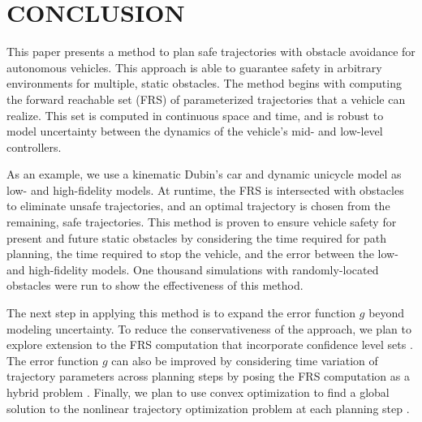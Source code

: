 \section{CONCLUSION}
\label{sec:conclusion}


This paper presents a method to plan safe trajectories with obstacle avoidance for autonomous vehicles.
This approach is able to guarantee safety in arbitrary environments for multiple, static obstacles.
The method begins with computing the forward reachable set (FRS) of parameterized trajectories that a vehicle can realize.
This set is computed in continuous space and time, and is robust to model uncertainty between the dynamics of the vehicle's mid- and low-level controllers.

As an example, we use a kinematic Dubin's car and dynamic unicycle model as low- and high-fidelity models.
At runtime, the FRS is intersected with obstacles to eliminate unsafe trajectories, and an optimal trajectory is chosen from the remaining, safe trajectories.
This method is proven to ensure vehicle safety for present and future static obstacles by considering the time required for path planning, the time required to stop the vehicle, and the error between the low- and high-fidelity models.
One thousand simulations with randomly-located obstacles were run to show the effectiveness of this method. 


The next step in applying this method is to expand the error function $g$ beyond modeling uncertainty.
To reduce the conservativeness of the approach, we plan to explore extension to the FRS computation that incorporate confidence level sets \cite{mohan2016convex,holmes2016convex}.
The error function $g$ can also be improved by considering time variation of trajectory parameters across planning steps by posing the FRS computation as a hybrid problem \cite{shia2014convex}.
Finally, we plan to use convex optimization to find a global solution to the nonlinear trajectory optimization problem at each planning step \cite{zhao2016control,zhao2017optimal}.
